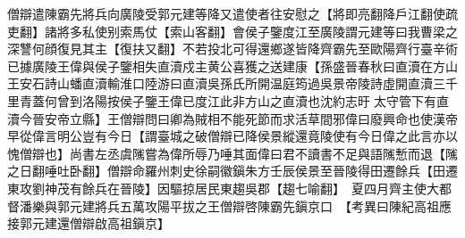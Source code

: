 僧辯遣陳霸先將兵向廣陵受郭元建等降又遣使者往安慰之【將即亮翻降戶江翻使疏吏翻】諸將多私使别索馬仗【索山客翻】會侯子鑒度江至廣陵謂元建等曰我曹梁之深讐何顔復見其主【復扶又翻】不若投北可得還鄉遂皆降齊霸先至歐陽齊行臺辛術已據廣陵王偉與侯子鑒相失直瀆戍主黄公喜獲之送建康【孫盛晉春秋曰直瀆在方山王安石詩山蟠直瀆輸淮口陸游曰直瀆吳孫氏所開温庭筠過吳景帝陵詩虛開直瀆三千里青蓋何曾到洛陽按侯子鑒王偉已度江此非方山之直瀆也沈約志旴太守管下有直瀆今晉安帝立縣】王僧辯問曰卿為賊相不能死節而求活草間邪偉曰廢興命也使漢帝早從偉言明公豈有今日【謂臺城之破僧辯已降侯景縱還竟陵使有今日偉之此言亦以愧僧辯也】尚書左丞虞隲嘗為偉所辱乃唾其面偉曰君不讀書不足與語隲慙而退【隲之日翻唾吐卧翻】僧辯命羅州刺史徐嗣徽鎭朱方壬辰侯景至晉陵得田遷餘兵【田遷東攻劉神茂有餘兵在晉陵】因驅掠居民東趨吳郡【趨七喻翻】　夏四月齊主使大都督潘樂與郭元建將兵五萬攻陽平拔之王僧辯啓陳霸先鎭京口　【考異曰陳紀高祖應接郭元建還僧辯啟高祖鎭京】

